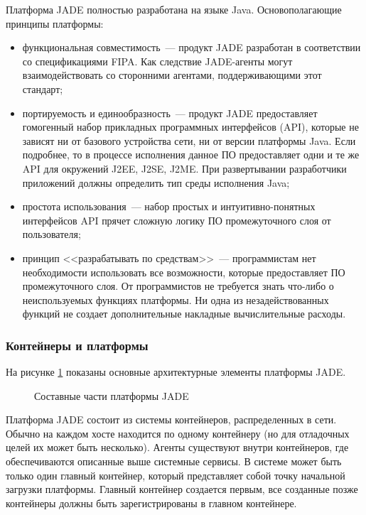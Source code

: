 Платформа JADE полностью разработана на языке Java. Основополагающие принципы платформы:
\begin{itemize}
\item функциональная совместимость~--- продукт JADE разработан в соответствии со спецификациями FIPA. Как следствие JADE-агенты могут взаимодействовать со сторонними агентами, поддерживающими этот стандарт;
\item портируемость и единообразность~--- продукт JADE предоставляет гомогенный набор прикладных программных интерфейсов (API), которые не зависят ни от базового устройства сети, ни от версии платформы Java. Если подробнее, то в процессе исполнения данное ПО предоставляет одни и те же API для окружений J2EE, J2SE, J2ME. При развертывании разработчики приложений должны определить тип среды исполнения Java;
\item простота использования~--- набор простых и интуитивно-понятных интерфейсов API прячет сложную логику ПО промежуточного слоя от пользователя;
\item принцип <<разрабатывать по средствам>>~--- программистам нет необходимости использовать все возможности, которые предоставляет ПО промежуточного слоя. От программистов не требуется знать что-либо о неиспользуемых функциях платформы. Ни одна из незадействованных функций не создает дополнительные накладные вычислительные расходы.
\end{itemize}

\subsubsection{Контейнеры и платформы}
На рисунке \ref{2:jade} показаны основные архитектурные элементы платформы JADE.
\begin{figure}[h]
\caption{Составные части платформы JADE}
\label{2:jade}
\end{figure}

Платформа JADE состоит из системы контейнеров, распределенных в сети.
Обычно на каждом хосте находится по одному контейнеру (но для отладочных целей их может быть несколько). Агенты существуют внутри контейнеров, где обеспечиваются описанные выше системные сервисы. В системе может быть только один главный контейнер, который представляет собой точку начальной загрузки платформы. Главный контейнер создается первым, все созданные позже контейнеры должны быть зарегистрированы в главном контейнере.

